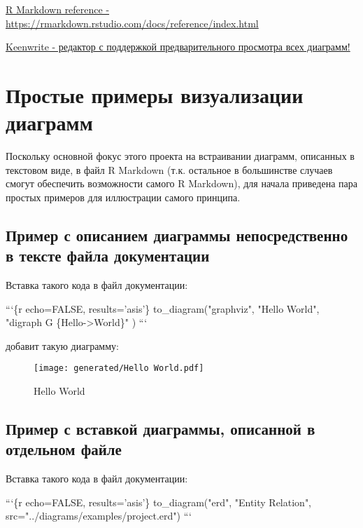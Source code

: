 \documentclass[12pt,a4paper,12pt,oneside,openany]{book}
\newenvironment{Shaded}{\begin{snugshade}}{\end{snugshade}}
\newcommand{\DataTypeTok}[1]{\textcolor[rgb]{0.27,0.27,0.27}{#1}}
\newcommand{\StringTok}[1]{\textcolor[rgb]{0.5,0.5,0.5}{#1}}
\begin{document}
\href{https://rmarkdown.rstudio.com/docs/reference/index.html}{R Markdown reference - https://rmarkdown.rstudio.com/docs/reference/index.html}

\href{https://github.com/DaveJarvis/keenwrite}{Keenwrite - редактор с поддержкой предварительного просмотра всех диаграмм!}

\chapter{Простые примеры визуализации диаграмм}\label{---}

Поскольку основной фокус этого проекта на встраивании диаграмм, описанных в текстовом виде, в файл R Markdown (т.к. остальное в большинстве случаев смогут обеспечить возможности самого R Markdown), для начала приведена пара простых примеров для иллюстрации самого принципа.

\section{Пример с описанием диаграммы непосредственно в тексте файла документации}\label{--------}

Вставка такого кода в файл документации:

\begin{Shaded}
\begin{Highlighting}[]
\StringTok{```}\DataTypeTok{\{r echo=FALSE, results='asis'\}}
\DataTypeTok{  to_diagram("graphviz", "Hello World",}
\DataTypeTok{  "digraph G \{Hello->World\}"}
\DataTypeTok{  )}
\StringTok{```}
\end{Highlighting}
\end{Shaded}

добавит такую диаграмму:

\begin{figure}
\centering
\texttt{[image: generated/Hello World.pdf]}
\caption{Hello World}
\end{figure}

\newpage

\section{Пример с вставкой диаграммы, описанной в отдельном файле}\label{-------}

Вставка такого кода в файл документации:

\begin{Shaded}
\begin{Highlighting}[]
\StringTok{```}\DataTypeTok{\{r echo=FALSE, results='asis'\}}
\DataTypeTok{  to_diagram("erd", "Entity Relation", src="../diagrams/examples/project.erd")}
\StringTok{```}
\end{Highlighting}
\end{Shaded}
\end{document}

